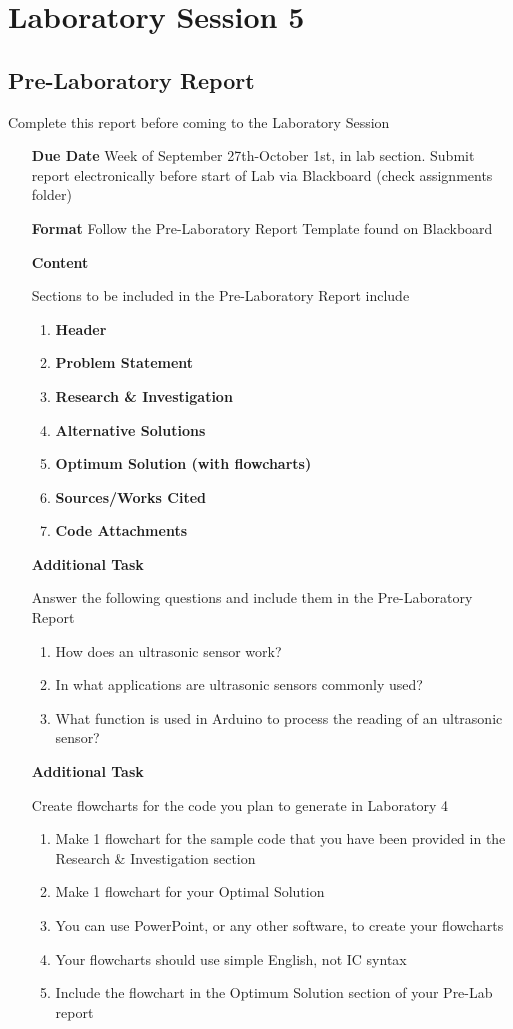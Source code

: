 \documentclass[]{report}
\begin{document}
\chapter{Laboratory Session 5}
\section{Pre-Laboratory Report}
Complete this report before coming to the Laboratory Session
\begin{itemize}
	\item[\textbf{Due Date}]{Week of September 27th-October 1st, \the\year \space in lab section. Submit report electronically before start of Lab via Blackboard (check assignments folder)}
	\item[\textbf{Format}]{Follow the Pre-Laboratory Report Template found on Blackboard}
	\item[\textbf{Content}]{Sections to be included in the Pre-Laboratory Report include
		\begin{enumerate}
			\item \textbf{Header}
			\item \textbf{Problem Statement}
			\item \textbf{Research \& Investigation}
			\item \textbf{Alternative Solutions}
			\item \textbf{Optimum Solution (with flowcharts)}
			\item \textbf{Sources/Works Cited}
			\item \textbf{Code Attachments}
		\end{enumerate}
		
	}
	
	\item[\textbf{Additional Task}]{Answer the following questions and include them in the Pre-Laboratory Report
		\begin{enumerate}[label=\alph*.]
			\item How does an ultrasonic sensor work?
			\item In what applications are ultrasonic sensors commonly used?
			\item What function is used in Arduino to process the reading of an ultrasonic sensor? 
		\end{enumerate}	
	}
	
	\item[\textbf{Additional Task}]{Create flowcharts for the code you plan to generate in Laboratory 4
		\begin{enumerate}[label=\alph*.]
			\item Make 1 flowchart for the sample code that you have been provided in the Research \& Investigation section 
			\item Make 1 flowchart for your Optimal Solution
			\item You can use PowerPoint, or any other software, to create your flowcharts
			\item Your flowcharts should use simple English, not IC syntax
			\item Include the flowchart in the Optimum Solution section of your Pre-Lab report
		\end{enumerate}
		
}
\end{itemize}
\end{document}
